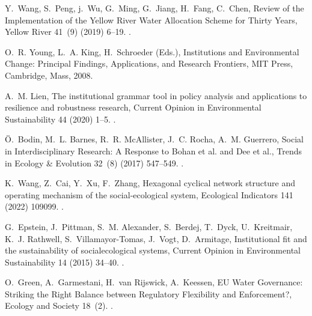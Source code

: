\documentclass[preprint, 12pt]{elsarticle}
\begin{document}
\begin{thebibliography}{10}
Y.~Wang, S.~Peng, j.~Wu, G.~Ming, G.~Jiang, H.~Fang, C.~Chen, {Review of the
  Implementation of the Yellow River Water Allocation Scheme for Thirty Years},
  Yellow River 41~(9) (2019) 6--19.
\newblock \href {http://dx.doi.org/10.3969/j.issn.1000-1379.2019.09.002}
  {}.

O.~R. Young, L.~A. King, H.~Schroeder (Eds.), Institutions and Environmental
  Change: Principal Findings, Applications, and Research Frontiers, {MIT
  Press}, {Cambridge, Mass}, 2008.

A.~M. Lien, The institutional grammar tool in policy analysis and applications
  to resilience and robustness research, Current Opinion in Environmental
  Sustainability 44 (2020) 1--5.
\newblock \href {http://dx.doi.org/10.1016/j.cosust.2020.02.004}
  {}.

{\"O}.~Bodin, M.~L. Barnes, R.~R. McAllister, J.~C. Rocha, A.~M. Guerrero,
  Social in {{Interdisciplinary
  Research}}: {{A Response}} to {{Bohan}} et al. and {{Dee}} et al., Trends in
  Ecology \& Evolution 32~(8) (2017) 547--549.
\newblock \href {http://dx.doi.org/10.1016/j.tree.2017.06.003}
  {}.

K.~Wang, Z.~Cai, Y.~Xu, F.~Zhang, Hexagonal cyclical network structure and
  operating mechanism of the social-ecological system, Ecological Indicators
  141 (2022) 109099.
\newblock \href {http://dx.doi.org/10.1016/j.ecolind.2022.109099}
  {}.

G.~Epstein, J.~Pittman, S.~M. Alexander, S.~Berdej, T.~Dyck, U.~Kreitmair,
  K.~J. Rathwell, S.~{Villamayor-Tomas}, J.~Vogt, D.~Armitage, Institutional
  fit and the sustainability of social\textendash ecological systems, Current
  Opinion in Environmental Sustainability 14 (2015) 34--40.
\newblock \href {http://dx.doi.org/10.1016/j.cosust.2015.03.005}
  {}.

O.~Green, A.~Garmestani, H.~{van Rijswick}, A.~Keessen, {{EU Water
  Governance}}: {{Striking}} the {{Right Balance}} between {{Regulatory
  Flexibility}} and {{Enforcement}}?, Ecology and Society 18~(2).
\newblock \href {http://dx.doi.org/10.5751/ES-05357-180210}
  {}.


\end{thebibliography}
\end{document}
